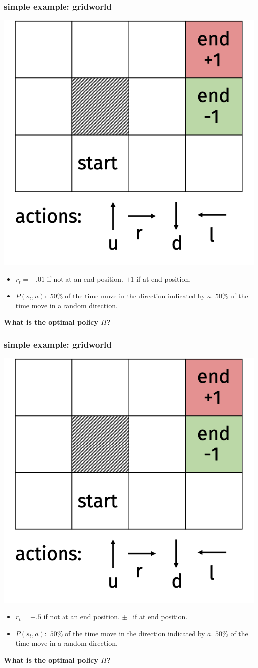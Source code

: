 \documentclass[handout,compress]{beamer}
\begin{document}
\begin{frame}
	\frametitle{simple example: gridworld}
	\begin{center}
		\includegraphics[width=.5\textwidth]{gridworld.png}

\vspace{-.5em}
	\begin{itemize}
		\item $r_t = -.01$ if not at an end position. $\pm 1$ if at end position.
		\item $P(s_t, a):$ $50\%$ of the time move in the direction indicated by $a$. $50\%$ of the time move in a random direction.   
	\end{itemize}
	\alert{\textbf{What is the optimal policy $\Pi$?}}
	\end{center}
\end{frame}


\begin{frame}
	\frametitle{simple example: gridworld}
	\begin{center}
		\includegraphics[width=.5\textwidth]{gridworld.png}
		
		\vspace{-.5em}
		\begin{itemize}
			\item $r_t = -.5$ if not at an end position. $\pm 1$ if at end position.
			\item $P(s_t, a):$ $50\%$ of the time move in the direction indicated by $a$. $50\%$ of the time move in a random direction.   
		\end{itemize}
		\alert{\textbf{What is the optimal policy $\Pi$?}}
	\end{center}
\end{frame}
\end{document}
